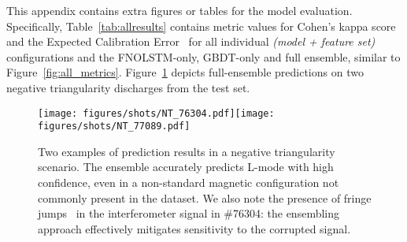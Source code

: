 This appendix contains extra figures or tables for the model evaluation. Specifically, Table~\ref{tab:allresults} contains metric values for Cohen's kappa score~\cite{cohen1960} and the Expected Calibration Error~\cite{degroot1983,naeini2015} for all individual \textit{(model + feature set)} configurations and the FNOLSTM-only, GBDT-only and full ensemble, similar to Figure~\ref{fig:all_metrics}. Figure~\ref{fig:s_nt} depicts full-ensemble predictions on two negative triangularity discharges from the test set.



\begin{figure}[h]
\begin{center}\texttt{[image: figures/shots/NT\_76304.pdf]}\texttt{[image: figures/shots/NT\_77089.pdf]}\end{center}
    \caption{Two examples of prediction results in a negative triangularity scenario. The ensemble accurately predicts L-mode with high confidence, even in a non-standard magnetic configuration not commonly present in the dataset. We also note the presence of fringe jumps~\cite{murari2006} in the interferometer signal in \#76304: the ensembling approach effectively mitigates sensitivity to the corrupted signal.}
    \label{fig:s_nt}%
\end{figure}

